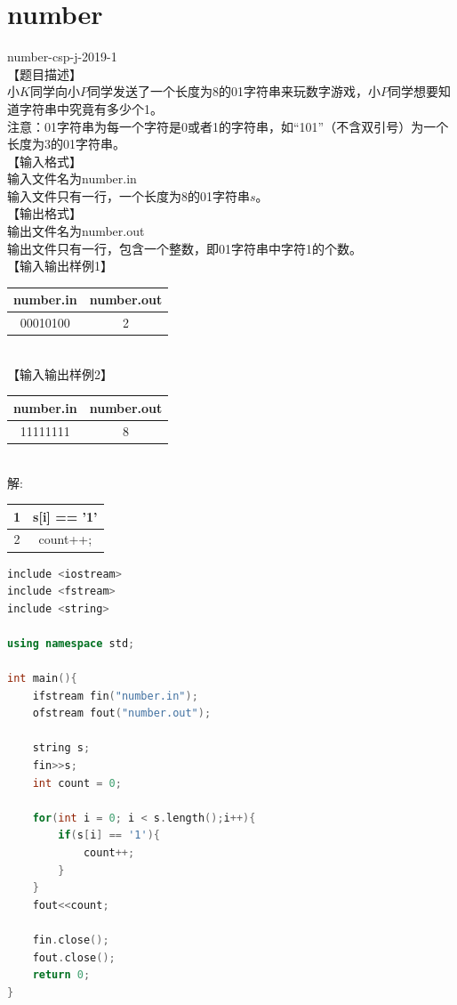 \documentclass[12pt,twiside,a4paper]{ctexbook}
\numberwithin{chapter}{part}
\begin{document}
\section{number}
number-csp-j-2019-1\\
【题目描述】\\
小$K$同学向小$P$同学发送了一个长度为8的01字符串来玩数字游戏，小$P$同学想要知道字符串中究竟有多少个1。\\
注意：01字符串为每一个字符是0或者1的字符串，如“101”（不含双引号）为一个长度为3的01字符串。\\
【输入格式】\\
输入文件名为number.in\\
输入文件只有一行，一个长度为8的01字符串$s$。\\
【输出格式】\\
输出文件名为number.out\\
输出文件只有一行，包含一个整数，即01字符串中字符1的个数。\\
【输入输出样例1】\\
\begin{tabular}{|c|c|}
\hline
number.in & number.out\\
\hline
00010100 & 2\\
\hline
\end{tabular}\\
【输入输出样例2】\\
\begin{tabular}{|c|c|}
\hline
number.in & number.out\\
\hline
11111111 & 8\\
\hline
\end{tabular}\\
解:\\
\begin{tabular}{|c|c|}
\hline
1 & s[i] == '1'\\
\hline
2 & count++; \\
\hline
\end{tabular}
\begin{lstlisting}[language=c++]
include <iostream>
include <fstream>
include <string>

using namespace std;

int main(){
	ifstream fin("number.in");
	ofstream fout("number.out");

	string s;
	fin>>s;
	int count = 0;

	for(int i = 0; i < s.length();i++){
		if(s[i] == '1'){
			count++;
		}
	}
	fout<<count;

	fin.close();
	fout.close();
	return 0;
}
\end{lstlisting}
\end{document}
